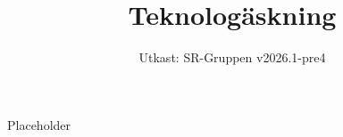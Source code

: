 \documentclass[a4paper]{dtek}
\title{Teknologäskning}
\date{Utkast: SR-Gruppen v2026.1-pre4}
\begin{document}
Placeholder
\end{document}
